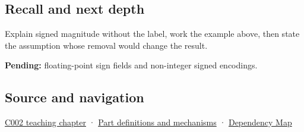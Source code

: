 \subsection{Recall and next depth}\label{appendix-ce20506c8532-recall-and-next-depth}

Explain signed magnitude without the label, work the example above, then state the assumption whose removal would change the result.

\textbf{Pending:} floating-point sign fields and non-integer signed encodings.

\subsection{Source and navigation}\label{appendix-ce20506c8532-source-and-navigation}

\hyperref[01-foundations-i-ch001-arithmetic-becomes-a-policy]{C002 teaching chapter} · \hyperref[appendix-fd090d982a15]{Part definitions and mechanisms} · \hyperref[appendix-4ad47bdd269a]{Dependency Map}
